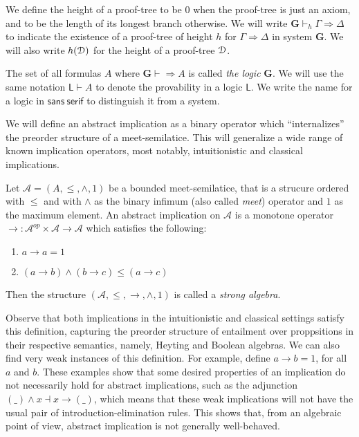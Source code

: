 We define the height of a proof-tree to be $0$ when the proof-tree is just an axiom, and to be the length of its longest branch otherwise.
We will write $\mathbf{G} \vdash_h \Gamma \Rightarrow \Delta$ to indicate the existence of a proof-tree of height $h$ for $\Gamma \Rightarrow \Delta$ in system $\mathbf{G}$. We will also write $h(\mathcal{D})$ for the height of a proof-tree $\mathcal{D}$.

The set of all formulas $A$ where $\mathbf{G} \vdash \Rightarrow A$ is called \emph{the logic} $\mathbf{G}$. We will use the same notation $\mathsf{L} \vdash A$ to denote the provability in a logic $\mathsf{L}$. We write the name for a logic in $\mathsf{sans~serif}$ to distinguish it from a system.

We will define an abstract implication as a binary operator which ``internalizes'' the preorder structure of a meet-semilatice. This will generalize a wide range of known implication operators, most notably, intuitionistic and classical implications.
\begin{dfn}
  Let $\mathcal{A} = (A, \le, \wedge, 1)$ be a bounded meet-semilatice, that is a strucure ordered with $\le$ and with $\wedge$ as the binary infimum (also called \emph{meet}) operator and $1$ as the maximum element. An abstract implication on $\mathcal{A}$ is a monotone operator $\rightarrow : \mathcal{A}^{op} \times \mathcal{A} \rightarrow \mathcal{A}$ which satisfies the following:
  \begin{enumerate}
    \item $a \rightarrow a = 1$
    \item $(a \rightarrow b) \wedge (b \rightarrow c) \le (a \rightarrow c)$
  \end{enumerate}
  Then the structure $(\mathcal{A}, \le, \rightarrow, \wedge, 1)$ is called a \emph{strong algebra}.
  \end{dfn}
  Observe that both implications in the intuitionistic and classical settings satisfy this definition, capturing the preorder structure of entailment over proppsitions in their respective semantics, namely, Heyting and Boolean algebras. We can also find very weak instances of this definition. For example, define $a \rightarrow b = 1$, for all $a$ and $b$. These examples show that some desired properties of an implication do not necessarily hold for abstract implications, such as the adjunction $(\_) \wedge x \dashv x \rightarrow (\_)$, which means that these weak implications will not have the usual pair of introduction-elimination rules. This shows that, from an algebraic point of view, abstract implication is not generally well-behaved.
  

